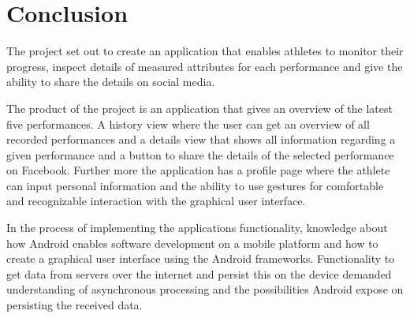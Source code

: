 \chapter{Conclusion}
The project set out to create an application that enables athletes to monitor their progress, inspect details of measured attributes for each performance and give the ability to share the details on social media.

The product of the project is an application that gives an overview of the latest five performances. 
A history view where the user can get an overview of all recorded performances and a details view that shows all information regarding a given performance and a button to share the details of the selected performance on Facebook. 
Further more the application has a profile page where the athlete can input personal information and the ability to use gestures for comfortable and recognizable interaction with the graphical user interface.

In the process of implementing the applications functionality, knowledge about how Android enables software development on a mobile platform and how to create a graphical user interface using the Android frameworks. 
Functionality to get data from servers over the internet and persist this on the device demanded understanding of asynchronous processing and the possibilities Android expose on persisting the received data.